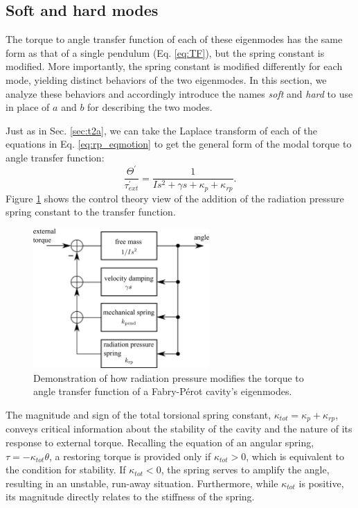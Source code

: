 \subsection{Soft and hard modes} 
The torque to angle transfer function of each of these eigenmodes has
the same form as that of a single pendulum (Eq. \ref{eq:TF}), but the
spring constant is modified. More importantly, the spring constant is
modified differently for each mode, yielding distinct behaviors of the
two eigenmodes. In this section, we analyze these behaviors and
accordingly introduce the names \emph{soft} and \emph{hard} to use in
place of $a$ and $b$ for describing the two modes.

Just as in Sec. \ref{sec:t2a}, we can take the Laplace transform of
each of the equations in Eq. \ref{eq:rp_eqmotion} to get the general
form of the modal torque to angle transfer function:
\begin{equation}
\frac{\Theta^\prime}{\tau_{ext}^\prime} = \frac{1}{I s^2 + \gamma s +
  \kappa_p + \kappa_{rp}}.
\label{eq:modalTF}
\end{equation} 
Figure \ref{fig:pendloop} shows the control theory view of
the addition of the radiation pressure spring constant to the transfer
function.

\begin{figure}
\begin{centering}
\includegraphics[width=0.6\textwidth]{figures/pendulumLoop.pdf}
\caption{Demonstration of how radiation pressure modifies the torque
  to angle transfer function of a Fabry-P\'{e}rot cavity's
  eigenmodes.}
\label{fig:pendloop}
\end{centering}
\end{figure}

The magnitude and sign of the total torsional spring constant,
$\kappa_{tot} = \kappa_p + \kappa_{rp}$, conveys critical information
about the stability of the cavity and the nature of its response to
external torque. Recalling the equation of an angular spring, $\tau =
- \kappa_{tot} \theta$, a restoring torque is provided only if
$\kappa_{tot} > 0$, which is equivalent to the condition for
stability. If $\kappa_{tot} < 0$, the spring serves to amplify the
angle, resulting in an unstable, run-away situation. Furthermore,
while $\kappa_{tot}$ is positive, its magnitude directly relates to
the stiffness of the spring.

